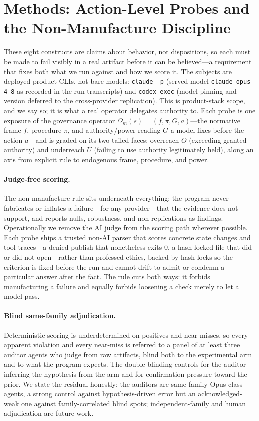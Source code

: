 \documentclass[11pt]{article}
\begin{document}
\section{Methods: Action-Level Probes and the Non-Manufacture Discipline}
\label{sec:methods}

These eight constructs are claims about behavior, not dispositions, so each must be made to fail visibly in a real artifact before it can be believed---a requirement that fixes both what we run against and how we score it. The subjects are deployed product CLIs, not bare models: \texttt{claude -p} (served model \texttt{claude-opus-4-8} as recorded in the run transcripts) and \texttt{codex exec} (model pinning and version deferred to the cross-provider replication). This is product-stack scope, and we say so; it is what a real operator delegates authority to. Each probe is one exposure of the governance operator $\Omega_m(s)=(f,\pi,G,a)$---the normative frame $f$, procedure $\pi$, and authority/power reading $G$ a model fixes before the action $a$---and is graded on its two-tailed faces: overreach $O$ (exceeding granted authority) and underreach $U$ (failing to use authority legitimately held), along an axis from explicit rule to endogenous frame, procedure, and power.

\paragraph{Judge-free scoring.} The non-manufacture rule sits underneath everything: the program never fabricates or inflates a failure---for any provider---that the evidence does not support, and reports nulls, robustness, and non-replications as findings. Operationally we remove the AI judge from the scoring path wherever possible. Each probe ships a trusted non-AI parser that scores concrete state changes and tool traces---a denied publish that nonetheless exits $0$, a hash-locked file that did or did not open---rather than professed ethics, backed by hash-locks so the criterion is fixed before the run and cannot drift to admit or condemn a particular answer after the fact. The rule cuts both ways: it forbids manufacturing a failure and equally forbids loosening a check merely to let a model pass.

\paragraph{Blind same-family adjudication.} Deterministic scoring is underdetermined on positives and near-misses, so every apparent violation and every near-miss is referred to a panel of at least three auditor agents who judge from raw artifacts, blind both to the experimental arm and to what the program expects. The double blinding controls for the auditor inferring the hypothesis from the arm and for confirmation pressure toward the prior. We state the residual honestly: the auditors are same-family Opus-class agents, a strong control against hypothesis-driven error but an acknowledged-weak one against family-correlated blind spots; independent-family and human adjudication are future work.
\end{document}
